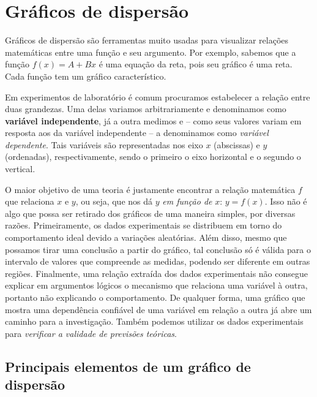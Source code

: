 \section{Gráficos de dispersão}

Gráficos de dispersão são ferramentas muito usadas para visualizar relações matemáticas entre uma função e seu argumento. Por exemplo, sabemos que a função $f(x) = A + Bx$ é uma equação da reta, pois seu gráfico é uma reta. Cada função tem um gráfico característico. 

Em experimentos de laboratório é comum procuramos estabelecer a relação entre duas grandezas. Uma delas variamos arbitrariamente e denominamos como \textbf{variável independente}, já a outra medimos e -- como seus valores variam em resposta aos da variável independente -- a denominamos como \emph{variável dependente}. Tais variáveis são representadas nos eixo $x$  (abscissas) e $y$ (ordenadas), respectivamente, sendo o primeiro o eixo horizontal e o segundo o vertical. 

O maior objetivo de uma teoria é justamente encontrar a relação matemática $f$ que relaciona $x$ e $y$, ou seja, que nos dá $y$ \emph{em função de} $x$: $y = f(x)$. Isso não é algo que possa ser retirado dos gráficos de uma maneira simples, por diversas razões. Primeiramente, os dados experimentais se distribuem em torno do comportamento ideal devido a variações aleatórias. Além disso, mesmo que possamos tirar uma conclusão a partir do gráfico, tal conclusão só é válida para o intervalo de valores que compreende as medidas, podendo ser diferente em outras regiões. Finalmente, uma relação extraída dos dados experimentais não consegue explicar em argumentos lógicos o mecanismo que relaciona uma variável à outra, portanto não explicando o comportamento. De qualquer forma, uma gráfico que mostra uma dependência confiável de uma variável em relação a outra já abre um caminho para a investigação. Também podemos utilizar os dados experimentais para \emph{verificar a validade de previsões teóricas}.

\subsection{Principais elementos de um gráfico de dispersão}

